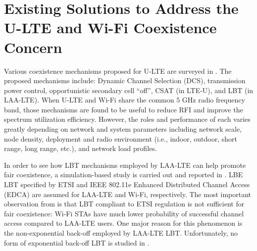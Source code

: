 \section{Existing Solutions to Address the U-LTE and Wi-Fi Coexistence Concern}

Various coexistence mechanisms proposed for U-LTE are surveyed in \cite{U-LTE-survey-2014, U-LTE-survey-2015, U-LTE-5G-2015}. The proposed mechanisms include: Dynamic Channel Selection (DCS), transmission power control, opportunistic secondary cell ``off'', CSAT (in LTE-U), and LBT (in LAA-LTE). When U-LTE and Wi-Fi share the common $5$ GHz radio frequency band, those mechanisms are found to be useful to reduce RFI and improve the spectrum utilization efficiency. However, the roles and performance of each varies greatly depending on network and system parameters including network scale, node density, deployment and radio environment (i.e., indoor, outdoor, short range, long range, etc.), and network load profiles. 

In order to see how LBT mechanisms employed by LAA-LTE can help promote fair coexistence, a simulation-based study is carried out and reported in \cite{LBT-CableLabs-2014}. LBE LBT specified by ETSI \cite{LBT-ETSI-2014} and IEEE 802.11e Enhanced Distributed Channel Access (EDCA) are assumed for LAA-LTE and Wi-Fi, respectively. The most important observation from \cite{LBT-CableLabs-2014} is that LBT compliant to ETSI regulation is not sufficient for fair coexistence: Wi-Fi STAs have much lower probability of successful channel access compared to LAA-LTE users. One major reason for this phenomenon is the non-exponential back-off employed by LAA-LTE LBT. Unfortunately, no form of exponential back-off LBT is studied in \cite{LBT-CableLabs-2014}.

